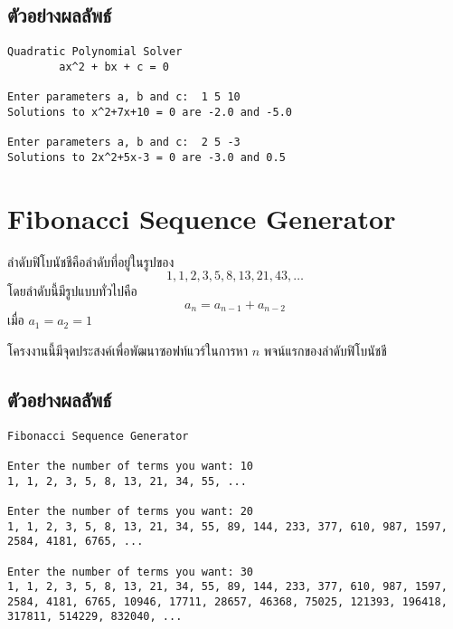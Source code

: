 \documentclass[a4paper]{article}
\begin{document}
\subsection*{ตัวอย่างผลลัพธ์}
\begin{verbatim}
Quadratic Polynomial Solver
        ax^2 + bx + c = 0 

Enter parameters a, b and c:  1 5 10
Solutions to x^2+7x+10 = 0 are -2.0 and -5.0

Enter parameters a, b and c:  2 5 -3
Solutions to 2x^2+5x-3 = 0 are -3.0 and 0.5
\end{verbatim}

\cleardoublepage
\section{Fibonacci Sequence Generator}
ลำดับฟิโบนัชชีคือลำดับที่อยู่ในรูปของ
\[ 1, 1, 2, 3, 5, 8, 13, 21, 43, \ldots \]
โดยลำดับนี้มีรูปแบบทั่วไปคือ
\[ a_n = a_{n-1} + a_{n-2} \]
เมื่อ $a_1 = a_2 = 1$

โครงงานนี้มีจุดประสงค์เพื่อพัฒนาซอฟท์แวร์ในการหา $n$ พจน์แรกของลำดับฟิโบนัชชี

\subsection*{ตัวอย่างผลลัพธ์}
\begin{verbatim}
Fibonacci Sequence Generator

Enter the number of terms you want: 10
1, 1, 2, 3, 5, 8, 13, 21, 34, 55, ...

Enter the number of terms you want: 20
1, 1, 2, 3, 5, 8, 13, 21, 34, 55, 89, 144, 233, 377, 610, 987, 1597, 2584, 4181, 6765, ... 

Enter the number of terms you want: 30
1, 1, 2, 3, 5, 8, 13, 21, 34, 55, 89, 144, 233, 377, 610, 987, 1597, 2584, 4181, 6765, 10946, 17711, 28657, 46368, 75025, 121393, 196418, 317811, 514229, 832040, ...
\end{verbatim}


 
  
\end{document}
